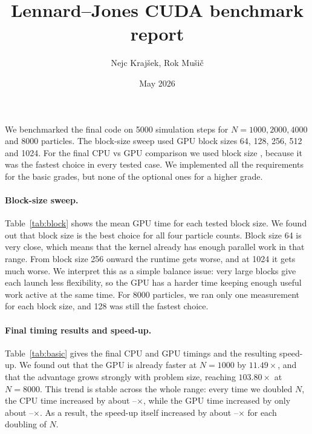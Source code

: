 \documentclass[10pt,a4paper]{article}
\title{Lennard--Jones CUDA benchmark report}
\author{Nejc Krajšek, Rok Mušič}
\date{May 2026}
\begin{document}
\maketitle
\vspace{-1.5em}

We benchmarked the final code on 5000 simulation steps for $N=1000, 2000, 4000$ and $8000$ particles. The block-size sweep used GPU block sizes 64, 128, 256, 512 and 1024. For the final CPU vs GPU comparison we used block size \BestBlockSize, because it was the fastest choice in every tested case. We implemented all the requirements for the basic grades, but none of the optional ones for a higher grade.

\paragraph{Block-size sweep.}
Table~\ref{tab:block} shows the mean GPU time for each tested block size. We found out that block size \BestBlockSize is the best choice for all four particle counts. Block size 64 is very close, which means that the kernel already has enough parallel work in that range. From block size 256 onward the runtime gets worse, and at 1024 it gets much worse. We interpret this as a simple balance issue: very large blocks give each launch less flexibility, so the GPU has a harder time keeping enough useful work active at the same time. For 8000 particles, we ran only one measurement for each block size, and 128 was still the fastest choice.

\begin{table}[h]
    \centering
    \caption{Mean GPU runtime [s] for the block-size sweep at 5000 steps. Best time in each row is bold.}
    \label{tab:block}
    \small
    
\end{table}

\paragraph{Final timing results and speed-up.}
Table~\ref{tab:basic} gives the final CPU and GPU timings and the resulting speed-up. We found out that the GPU is already faster at $N=1000$ by $11.49\times$, and that the advantage grows strongly with problem size, reaching $103.80\times$ at $N=8000$. This trend is stable across the whole range: every time we doubled $N$, the CPU time increased by about \CpuDoublingMin{}--\CpuDoublingMax$\times$, while the GPU time increased by only about \GpuDoublingMin{}--\GpuDoublingMax$\times$. As a result, the speed-up itself increased by about \SpeedupDoublingMin{}--\SpeedupDoublingMax$\times$ for each doubling of $N$.
\end{document}
